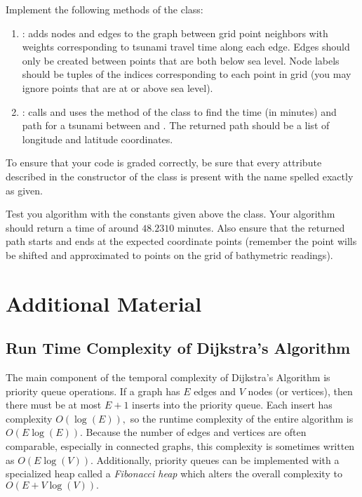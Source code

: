 \begin{problem}
Implement the following methods of the  class:
\begin{enumerate}
\item {}: adds nodes and edges to the graph between grid point neighbors with weights corresponding to tsunami travel time along each edge.
Edges should only be created between points that are both below sea level.
Node labels should be tuples of the indices corresponding to each point in grid (you may ignore points that are at or above sea level).
\item {}: calls  and uses the  method of the  class to find the time (in minutes) and path for a tsunami between  and .
The returned path should be a list of longitude and latitude coordinates.
\end{enumerate}
\end{problem}

\begin{warn}
    To ensure that your code is graded correctly, be sure that every attribute described in the constructor of the  class is present with the name spelled exactly as given.
\end{warn}
Test you algorithm with the constants given above the  class.
Your algorithm should return a time of around $48.2310$ minutes.
Also ensure that the returned path starts and ends at the expected coordinate points (remember the point wills be shifted and approximated to points on the grid of bathymetric readings).

\newpage

\section*{Additional Material} %

\subsection*{Run Time Complexity of Dijkstra's Algorithm} %

The main component of the temporal complexity of Dijkstra's Algorithm is priority queue operations.
If a graph has $E$ edges and $V$ nodes (or vertices), then there must be at most $E+1$ inserts into the priority queue.
Each insert has complexity $O(\log(E)),$ so the runtime complexity of the entire algorithm is $O(E\log(E)).$
Because the number of edges and vertices are often comparable, especially in connected graphs, this complexity is sometimes written as $O(E\log(V)).$
Additionally, priority queues can be implemented with a specialized heap called a \emph{Fibonacci heap} which alters the overall complexity to $O(E + V\log(V)).$

